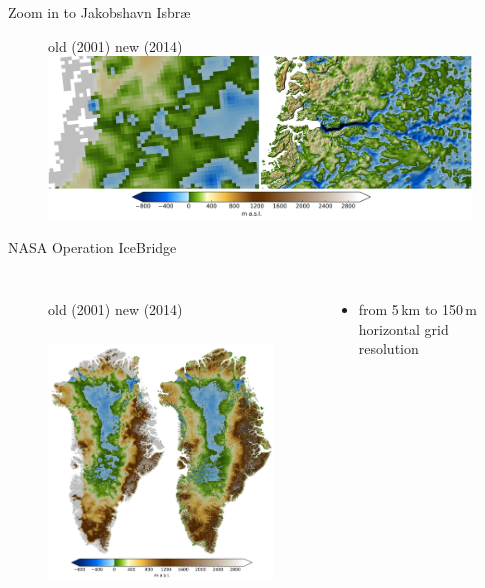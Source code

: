 \documentclass[hide notes,intlimits]{beamer}
\begin{document}
\begin{frame}{Zoom in to Jakobshavn Isbr{\ae}}
  \begin{figure}
    \small{old (2001) \hspace{5em} new (2014)}
    \includegraphics[width=12cm]{jako_bed}
 \end{figure}
\end{frame}


\begin{frame}{NASA Operation IceBridge}
  \begin{columns}
    \column[c]{8cm}
    \begin{figure}
      \small{old (2001) \hspace{4em} new (2014)}
      \includegraphics[height=7.5cm]{greenland_bed}
    \end{figure}
    \column[c]{4cm}
    \begin{itemize}
    \item from 5\,km to 150\,m horizontal grid resolution
    \end{itemize}
  \end{columns}
\end{frame}
\end{document}
